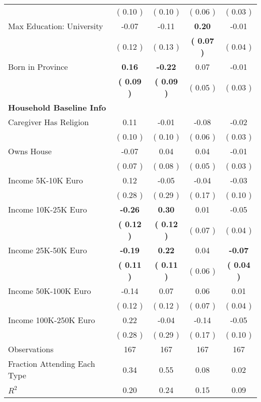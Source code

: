 \begin{table}[H]
{\begin{tabular}{lcccc}
\quad  & (     0.10 ) & (     0.10 )  & (     0.06 )  & (     0.03 )  \\
\quad Max Education: University &     -0.07 &     -0.11 & \textbf{     0.20} &     -0.01 \\
\quad  & (     0.12 ) & (     0.13 )  & \textbf{(     0.07 )}  & (     0.04 )  \\
\quad Born in Province & \textbf{     0.16} & \textbf{    -0.22} &      0.07 &     -0.01 \\
\quad  & \textbf{(     0.09 )} & \textbf{(     0.09 )}  & (     0.05 )  & (     0.03 )  \\
\midrule
\textbf{Household Baseline Info} \\
\quad Caregiver Has Religion &      0.11 &     -0.01 &     -0.08 &     -0.02 \\
\quad  & (     0.10 ) & (     0.10 )  & (     0.06 )  & (     0.03 )  \\
\quad Owns House &     -0.07 &      0.04 &      0.04 &     -0.01 \\
\quad  & (     0.07 ) & (     0.08 )  & (     0.05 )  & (     0.03 )  \\
\quad Income 5K-10K Euro &      0.12 &     -0.05 &     -0.04 &     -0.03 \\
\quad  & (     0.28 ) & (     0.29 )  & (     0.17 )  & (     0.10 )  \\
\quad Income 10K-25K Euro & \textbf{    -0.26} & \textbf{     0.30} &      0.01 &     -0.05 \\
\quad  & \textbf{(     0.12 )} & \textbf{(     0.12 )}  & (     0.07 )  & (     0.04 )  \\
\quad Income 25K-50K Euro & \textbf{    -0.19} & \textbf{     0.22} &      0.04 & \textbf{    -0.07} \\
\quad  & \textbf{(     0.11 )} & \textbf{(     0.11 )}  & (     0.06 )  & \textbf{(     0.04 )}  \\
\quad Income 50K-100K Euro &     -0.14 &      0.07 &      0.06 &      0.01 \\
\quad  & (     0.12 ) & (     0.12 )  & (     0.07 )  & (     0.04 )  \\
\quad Income 100K-250K Euro &      0.22 &     -0.04 &     -0.14 &     -0.05 \\
\quad  & (     0.28 ) & (     0.29 )  & (     0.17 )  & (     0.10 )  \\
\midrule
Observations & 167 & 167 & 167 & 167 \\
Fraction Attending Each Type &      0.34 &      0.55 &      0.08 &      0.02 \\
\midrule
$ R^2$ &      0.20 &      0.24 &      0.15 &      0.09 \\
\bottomrule
\end{tabular}}
\end{table}
